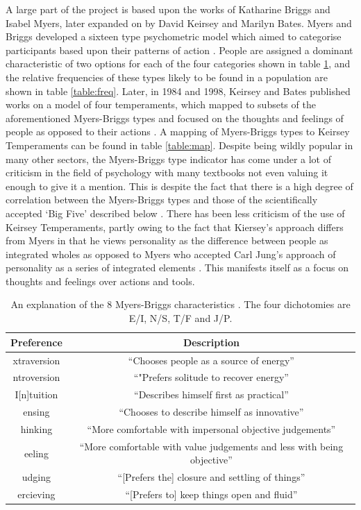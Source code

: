 \documentclass[12pt,a4paper,twoside]{report}
\begin{document}
A large part of the project is based upon the works of Katharine Briggs and Isabel Myers, later expanded on by David Keirsey and Marilyn Bates. Myers and Briggs developed a sixteen type psychometric model which aimed to categorise participants based upon their patterns of action \cite{myers1995gifts}. People are assigned a dominant characteristic of two options for each of the four categories shown in table \ref{table:type}, and the relative frequencies of these types likely to be found in a population are shown in table \ref{table:freq}. Later, in 1984 and 1998, Keirsey and Bates published works on a model of four temperaments, which mapped to subsets of the aforementioned Myers-Briggs types and focused on the thoughts and feelings of people as opposed to their actions \cite{keirsey1998please} \cite{keirsey1984}. A mapping of Myers-Briggs types to Keirsey Temperaments can be found in table \ref{table:map}. Despite being wildly popular in many other sectors, the Myers-Briggs type indicator has come under a lot of criticism in the field of psychology with many textbooks not even valuing it enough to give it a mention. This is despite the fact that there is a high degree of correlation between the Myers-Briggs types and those of the scientifically accepted `Big Five' described below \cite{lloyd2012myers}. There has been less criticism of the use of Keirsey Temperaments, partly owing to the fact that Kiersey's approach differs from Myers in that he views personality as the difference between people as integrated wholes as opposed to Myers who accepted Carl Jung's approach of personality as a series of integrated elements \cite{jung1923psychological} \cite{keirsey1998please} \cite{lloyd2012myers}. This manifests itself as a focus on thoughts and feelings over actions and tools.

\begin{table}
	\begin{center}
	\begin{tabular}{|c|c|}
		\hline Preference & Description \\ 
		\hline [E]xtraversion & ``Chooses people as a source of energy'' \\ 
		\hline [I]ntroversion & ``"Prefers solitude to recover energy'' \\ 
		\hline I[n]tuition & ``Describes himself first as practical'' \\ 
		\hline [S]ensing & ``Chooses to describe himself as innovative'' \\ 
		\hline [T]hinking & ``More comfortable with impersonal objective judgements'' \\ 
		\hline [F]eeling & ``More comfortable with value judgements and less with being objective'' \\ 
		\hline [J]udging & ``[Prefers the] closure and settling of things'' \\ 
		\hline [P]ercieving & ``[Prefers to] keep things open and fluid'' \\ 
		\hline 
	\end{tabular}
	\end{center}
	\caption{An explanation of the 8 Myers-Briggs characteristics \cite{myers1995gifts}. The four dichotomies are E/I, N/S, T/F and J/P.}
	\label{table:type}
\end{table}
\end{document}
